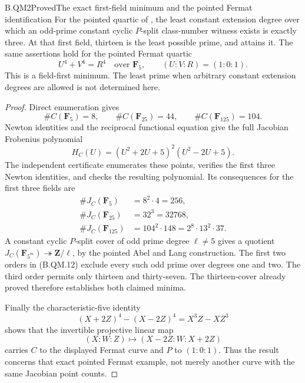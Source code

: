 \begin{claim}{B.QM2}{Proved}{The exact first-field minimum and the pointed Fermat identification}
For the pointed quartic of , the least
constant extension degree over which an odd-prime constant
cyclic $P$-split class-number witness exists is exactly three.
At that first field, thirteen is the least possible prime,
and  attains it. The same assertions hold
for the pointed Fermat quartic
\[
       U^4+V^4=R^4\quad\text{over }\mathbf F_5,
                   \qquad (U:V:R)=(1:0:1).
\]
This is a field-first minimum. The least prime when arbitrary
constant extension degrees are allowed is not determined here.
\end{claim}
\begin{proof}
Direct enumeration gives
\[
 \#C(\mathbf F_5)=8,\qquad
 \#C(\mathbf F_{25})=44,\qquad
 \#C(\mathbf F_{125})=104.
\]
Newton identities and the reciprocal functional equation
give the full Jacobian Frobenius polynomial
\[
          H_C(U)=(U^2+2U+5)^2(U^2-2U+5).                       \tag{B.QM.11}
\]
The independent certificate enumerates these points, verifies
the first three Newton identities, and checks the resulting
polynomial. Its consequences for the first three fields are
\[
\begin{split}
 \#J_C(\mathbf F_5)&=8^2\cdot4=256,\\
 \#J_C(\mathbf F_{25})&=32^3=32768,\\
 \#J_C(\mathbf F_{125})&=104^2\cdot148
                         =2^8\cdot13^2\cdot37.
\end{split}                                                    \tag{B.QM.12}
\]
A constant cyclic $P$-split cover of odd prime degree
$\ell\ne5$ gives a quotient $J_C(\mathbf F_{5^m})\twoheadrightarrow
\mathbf Z/\ell$, by the pointed Abel and Lang construction.
The first two orders in (B.QM.12) exclude every such odd prime
over degrees one and two. The third order permits only
thirteen and thirty-seven. The thirteen-cover already proved
therefore establishes both claimed minima.

Finally the characteristic-five identity
\[
       (X+2Z)^4-(X-2Z)^4=X^3Z-XZ^3
\]
shows that the invertible projective linear map
\[
       (X:W:Z)\longmapsto(X-2Z:W:X+2Z)
\]
carries $C$ to the displayed Fermat curve and $P$ to
$(1:0:1)$. Thus the result concerns that exact pointed
Fermat example, not merely another curve with the same
Jacobian point counts.
\end{proof}
